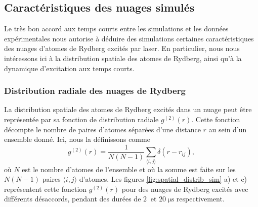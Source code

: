 	\subsection{Caractéristiques des nuages simulés}
\noindent Le très bon accord aux temps courts entre les simulations et les données expérimentales nous autorise à déduire des simulations certaines caractéristiques des nuages d'atomes de Rydberg excités par laser.
En particulier, nous nous intéressons ici à la distribution spatiale des atomes de Rydberg, ainsi qu'à la dynamique d'excitation aux temps courts.

\subsubsection*{Distribution radiale des nuages de Rydberg}

\noindent La distribution spatiale des atomes de Rydberg excités dans un nuage peut être représentée par sa fonction de distribution radiale $g^{(2)}(r)$.
Cette fonction décompte le nombre de paires d'atomes séparées d'une distance $r$ au sein d'un ensemble donné.
Ici, nous la définissons comme
\begin{equation}
\label{eq:g2r_def}
g^{(2)}(r) = \frac{1}{N(N-1)} \sum_{\langle i,j \rangle}{\delta (r-r_{ij})},
\end{equation}
où $N$ est le nombre d'atomes de l'ensemble et où la somme est faite sur les $N(N-1)$ paires $\langle i,j \rangle$ d'atomes.
Les figures \ref{fig:spatial_distrib_sim} a) et c) représentent cette fonction $g^{(2)}(r)$ pour des nuages de Rydberg excités avec différents désaccords, pendant des durées de $\SI{2}{}$ et $\SI{20}{\us}$ respectivement.

